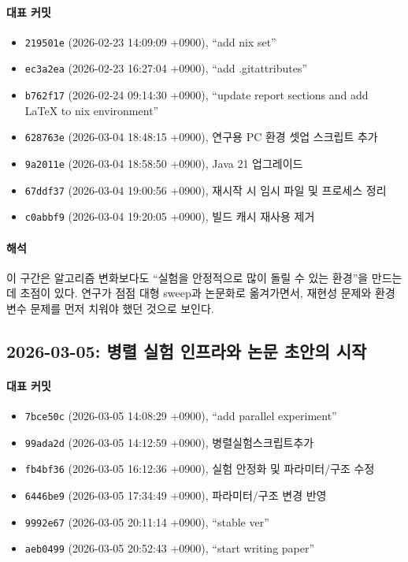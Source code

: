 \documentclass[12pt,a4paper]{article}
\begin{document}
\paragraph{대표 커밋}
\begin{itemize}[leftmargin=1.5em]
\item \texttt{219501e} (2026-02-23 14:09:09 +0900), ``add nix set''
\item \texttt{ec3a2ea} (2026-02-23 16:27:04 +0900), ``add .gitattributes''
\item \texttt{b762f17} (2026-02-24 09:14:30 +0900), ``update report sections and add LaTeX to nix environment''
\item \texttt{628763e} (2026-03-04 18:48:15 +0900), 연구용 PC 환경 셋업 스크립트 추가
\item \texttt{9a2011e} (2026-03-04 18:58:50 +0900), Java 21 업그레이드
\item \texttt{67ddf37} (2026-03-04 19:00:56 +0900), 재시작 시 임시 파일 및 프로세스 정리
\item \texttt{c0abbf9} (2026-03-04 19:20:05 +0900), 빌드 캐시 재사용 제거
\end{itemize}

\paragraph{해석}
이 구간은 알고리즘 변화보다도 ``실험을 안정적으로 많이 돌릴 수 있는 환경''을 만드는
데 초점이 있다. 연구가 점점 대형 sweep과 논문화로 옮겨가면서,
재현성 문제와 환경 변수 문제를 먼저 치워야 했던 것으로 보인다.

\subsection{2026-03-05: 병렬 실험 인프라와 논문 초안의 시작}

\paragraph{대표 커밋}
\begin{itemize}[leftmargin=1.5em]
\item \texttt{7bce50c} (2026-03-05 14:08:29 +0900), ``add parallel experiment''
\item \texttt{99ada2d} (2026-03-05 14:12:59 +0900), 병렬실험스크립트추가
\item \texttt{fb4bf36} (2026-03-05 16:12:36 +0900), 실험 안정화 및 파라미터/구조 수정
\item \texttt{6446be9} (2026-03-05 17:34:49 +0900), 파라미터/구조 변경 반영
\item \texttt{9992e67} (2026-03-05 20:11:14 +0900), ``stable ver''
\item \texttt{aeb0499} (2026-03-05 20:52:43 +0900), ``start writing paper''
\end{itemize}
\end{document}
